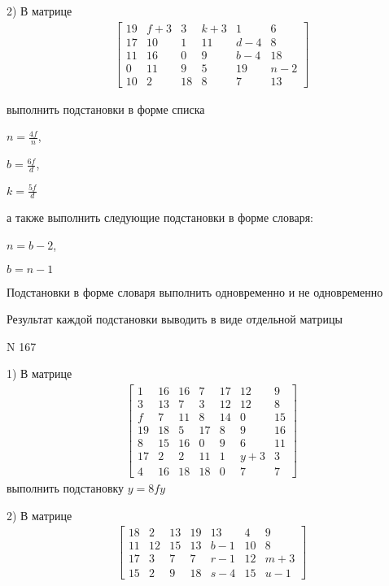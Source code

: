 \documentclass[11pt]{report}
\begin{document}
    2) В матрице
\begin{align*}
\left[\begin{matrix}19 & f + 3 & 3 & k + 3 & 1 & 6\\17 & 10 & 1 & 11 & d - 4 & 8\\11 & 16 & 0 & 9 & b - 4 & 18\\0 & 11 & 9 & 5 & 19 & n - 2\\10 & 2 & 18 & 8 & 7 & 13\end{matrix}\right]
\end{align*}

выполнить подстановки в форме списка

$n=\frac{4 f}{n}$,

$b=\frac{6 f}{d}$,

$k=\frac{5 f}{d}$

а также выполнить следующие подстановки в форме словаря:

$n=b - 2$,

$b=n - 1$


    Подстановки в форме словаря выполнить одновременно и не одновременно


    Результат каждой подстановки выводить в виде отдельной матрицы

\newpage
N 167


    1) В матрице
\begin{align*}
\left[\begin{matrix}1 & 16 & 16 & 7 & 17 & 12 & 9\\3 & 13 & 7 & 3 & 12 & 12 & 8\\f & 7 & 11 & 8 & 14 & 0 & 15\\19 & 18 & 5 & 17 & 8 & 9 & 16\\8 & 15 & 16 & 0 & 9 & 6 & 11\\17 & 2 & 2 & 11 & 1 & y + 3 & 3\\4 & 16 & 18 & 18 & 0 & 7 & 7\end{matrix}\right]
\end{align*}
выполнить подстановку $y=8 f y$


    2) В матрице
\begin{align*}
\left[\begin{matrix}18 & 2 & 13 & 19 & 13 & 4 & 9\\11 & 12 & 15 & 13 & b - 1 & 10 & 8\\17 & 3 & 7 & 7 & r - 1 & 12 & m + 3\\15 & 2 & 9 & 18 & s - 4 & 15 & u - 1\end{matrix}\right]
\end{align*}
\end{document}
